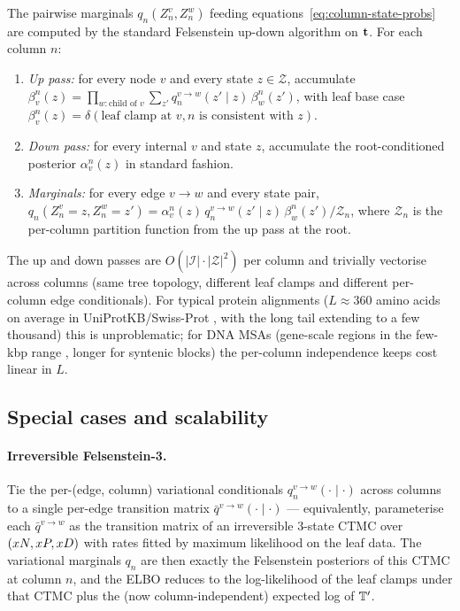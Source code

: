 The pairwise marginals $q_n(Z^v_n, Z^w_n)$ feeding
equations~\eqref{eq:column-state-probs} are computed by the standard
Felsenstein up-down algorithm on $\mathbf{t}$.
For each column $n$:
\begin{enumerate}[nosep]
\item \emph{Up pass:} for every node $v$ and every state
  $z \in \mathcal{Z}$, accumulate
  $\beta_v^n(z) = \prod_{w: \text{child of } v} \sum_{z'}
                  q_n^{v \to w}(z' \mid z)\,\beta_w^n(z')$,
  with leaf base case
  $\beta_v^n(z) = \delta(\text{leaf clamp at } v, n \text{ is consistent with } z)$.
\item \emph{Down pass:} for every internal $v$ and state $z$,
  accumulate the root-conditioned posterior
  $\alpha_v^n(z)$ in standard fashion.
\item \emph{Marginals:} for every edge $v \to w$ and every state pair,
  $q_n(Z^v_n = z, Z^w_n = z')
    = \alpha_v^n(z)\,q_n^{v \to w}(z' \mid z)\,
      \beta_w^n(z') / \mathcal{Z}_n$,
  where $\mathcal{Z}_n$ is the per-column partition function from the
  up pass at the root.
\end{enumerate}
The up and down passes are $O(|\mathcal{I}| \cdot |\mathcal{Z}|^2)$
per column and trivially vectorise across columns
(same tree topology, different leaf clamps and different per-column
edge conditionals).
For typical protein alignments
($L \approx 360$ amino acids on average in UniProtKB/Swiss-Prot
\cite{UniProtStatistics}, with the long tail extending to a few thousand)
this is unproblematic; for DNA MSAs (gene-scale regions in the few-kbp
range \cite{XuEtAl2006}, longer for syntenic blocks)
the per-column independence keeps cost linear in $L$.

\subsection{Special cases and scalability}
\label{sec:varanc-presence-special-cases}

\paragraph{Irreversible Felsenstein-3.}
Tie the per-(edge, column) variational conditionals
$q_n^{v \to w}(\cdot \mid \cdot)$ across columns to a single
per-edge transition matrix $\bar{q}^{v \to w}(\cdot \mid \cdot)$ —
equivalently, parameterise each $\bar{q}^{v \to w}$ as the
transition matrix of an irreversible 3-state CTMC over
$(x{N}, x{P}, x{D})$ with rates fitted by maximum
likelihood on the leaf data.
The variational marginals $q_n$ are then exactly the Felsenstein
posteriors of this CTMC at column $n$, and the ELBO reduces to the
log-likelihood of the leaf clamps under that CTMC plus the (now
column-independent) expected log of $\mathbb{T}'$.

